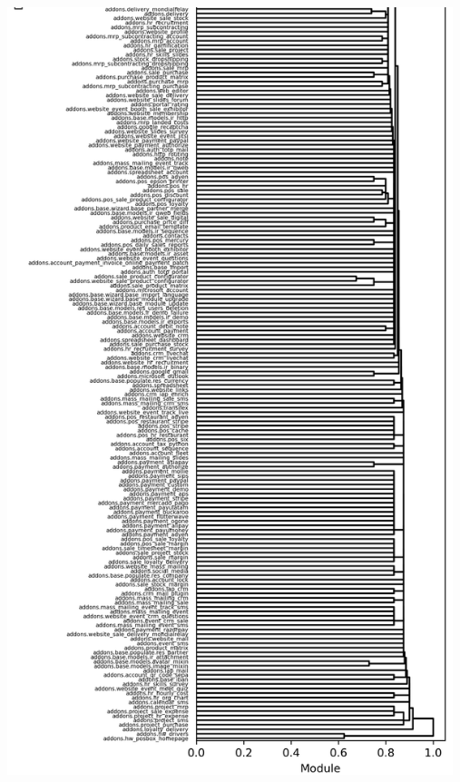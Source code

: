 \pagebreak
\begin{center}
  \includegraphics[width=13cm]{img/lampiran/single-full-2.png}
  \label{fig:single-full-2}
\end{center}
\pagebreak
